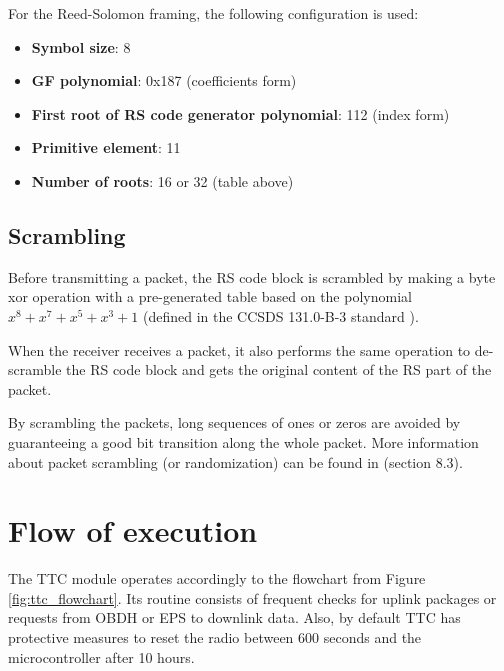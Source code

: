 For the Reed-Solomon framing, the following configuration is used:

\begin{itemize}
    \item \textbf{Symbol size}: 8
    \item \textbf{GF polynomial}: 0x187 (coefficients form)
    \item \textbf{First root of RS code generator polynomial}: 112 (index form)
    \item \textbf{Primitive element}: 11
    \item \textbf{Number of roots}: 16 or 32 (table above)
\end{itemize}

\subsection{Scrambling}

Before transmitting a packet, the RS code block is scrambled by making a byte xor operation with a pre-generated table based on the polynomial $x^{8} + x^{7} + x^{5} + x^{3} + 1$ (defined in the CCSDS 131.0-B-3 standard \cite{ccsds}).

When the receiver receives a packet, it also performs the same operation to de-scramble the RS code block and gets the original content of the RS part of the packet.

By scrambling the packets, long sequences of ones or zeros are avoided by guaranteeing a good bit transition along the whole packet. More information about packet scrambling (or randomization) can be found in \cite{ccsds} (section 8.3).

\section{Flow of execution}

The TTC module operates accordingly to the flowchart from Figure \ref{fig:ttc_flowchart}. Its routine consists of frequent checks for uplink packages or requests from OBDH or EPS to downlink data. Also, by default TTC has protective measures to reset the radio between 600 seconds and the microcontroller after 10 hours.

